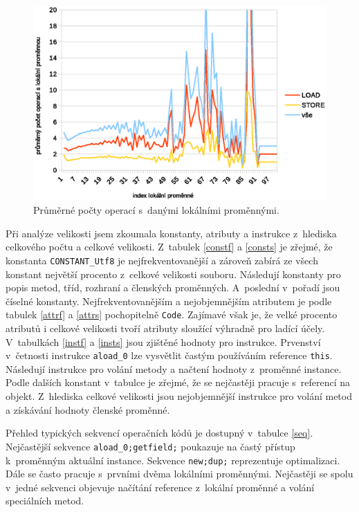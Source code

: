 \begin{figure}[h!]
\centering
\includegraphics[scale=0.9]{fig/locals} 
\caption{Průměrné počty operací s~danými lokálními proměnnými.}\label{vars}
\end{figure}


Při analýze velikosti jsem zkoumala konstanty, atributy a instrukce z~hlediska celkového počtu a celkové velikosti. Z~tabulek \ref{constf} a \ref{consts} je zřejmé, že konstanta \texttt{CONSTANT\_Utf8} je nejfrekventovanější a zároveň zabírá ze všech konstant největší procento z~celkové velikosti souboru. Následují konstanty pro popis metod, tříd, rozhraní a členských proměnných. A~poslední v~pořadí jsou číselné konstanty.
Nejfrekventovanějším a nejobjemnějším atributem je podle tabulek \ref{attrf} a \ref{attrs} pochopitelně \texttt{Code}. Zajímavé však je, že velké procento atributů i celkové velikosti tvoří atributy sloužící výhradně pro ladící účely.
V~tabulkách \ref{instf} a \ref{insts} jsou zjištěné hodnoty pro instrukce. Prvenství v~četnosti instrukce \texttt{aload\_0} lze vysvětlit častým používáním reference \texttt{this}. Následují instrukce pro volání metody a načtení hodnoty z~proměnné instance. Podle dalších konstant v~tabulce je zřejmé, že se nejčastěji pracuje s~referencí na objekt.
Z~hlediska celkové velikosti jsou nejobjemnější instrukce pro volání metod a získávání hodnoty členské proměnné.

Přehled typických sekvencí operačních kódů je dostupný v~tabulce \ref{seq}. Nejčastější sekvence \texttt{aload\_0;getfield;} poukazuje na častý přístup k~proměnným aktuální instance. Sekvence \texttt{new;dup;} reprezentuje optimalizaci. Dále se často pracuje s~prvními dvěma lokálními proměnnými. Nejčastěji se spolu v~jedné sekvenci objevuje načítání reference z~lokální proměnné a volání speciálních metod.

